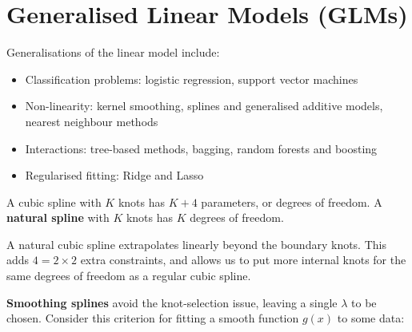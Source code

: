 \section{Generalised Linear Models (GLMs)}

Generalisations of the linear model include:

\begin{itemize}
	\item Classification problems: logistic regression, support vector machines
	\item Non-linearity: kernel smoothing, splines and generalised additive models, nearest neighbour methods
	\item Interactions: tree-based methods, bagging, random forests and boosting
	\item Regularised fitting: Ridge and Lasso
\end{itemize}


A cubic spline with $K$ knots has $K + 4$ parameters, or degrees of freedom. A \textbf{natural spline} with $K$ knots has $K$ degrees of freedom.

A natural cubic spline extrapolates linearly beyond the boundary knots. This adds $4 = 2 \times 2$ extra constraints, and allows us to put more internal knots for the same degrees of freedom as a regular cubic spline.

\textbf{Smoothing splines} avoid the knot-selection issue, leaving a single $\lambda$ to be chosen. Consider this criterion for fitting a smooth function $g(x)$ to some data:

